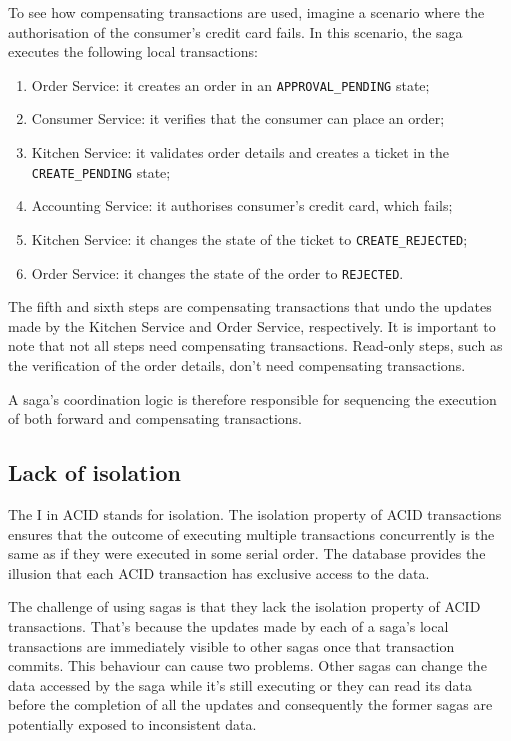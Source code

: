 \documentclass[conference]{IEEEtran}
\begin{document}
To see how compensating transactions are used, imagine a scenario where the authorisation of the consumer's credit card fails. In this scenario, the saga executes the following local transactions:

\begin{enumerate}
  \item Order Service: it creates an order in an \texttt{APPROVAL\_PENDING} state;
  \item Consumer Service: it verifies that the consumer can place an order;
  \item Kitchen Service: it validates order details and creates a ticket in the \texttt{CREATE\_PENDING} state;
  \item Accounting Service: it authorises consumer's credit card, which fails;
  \item Kitchen Service: it changes the state of the ticket to \texttt{CREATE\_REJECTED};
  \item Order Service: it changes the state of the order to \texttt{REJECTED}.
\end{enumerate}

The fifth and sixth steps are compensating transactions that undo the updates made by the Kitchen Service and Order Service, respectively. It is important to note that not all steps need compensating transactions. Read-only steps, such as the verification of the order details, don't need compensating transactions.

A saga's coordination logic is therefore responsible for sequencing the execution of both forward and compensating transactions.

\subsection{Lack of isolation}

The I in ACID stands for isolation. The isolation property of ACID transactions ensures that the outcome of executing multiple transactions concurrently is the same as if they were executed in some serial order. The database provides the illusion that each ACID transaction has exclusive access to the data.

The challenge of using sagas is that they lack the isolation property of ACID transactions. That's because the updates made by each of a saga's local transactions are immediately visible to other sagas once that transaction commits. This behaviour can cause two problems. Other sagas can change the data accessed by the saga while it's still executing or they can read its data before the completion of all the updates and consequently the former sagas are potentially exposed to inconsistent data.
\end{document}

